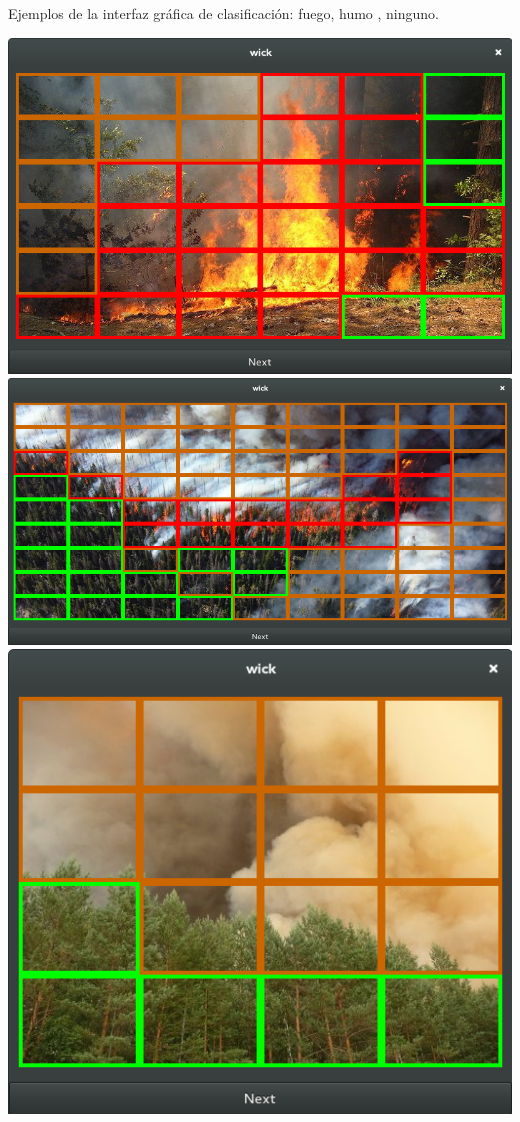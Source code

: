 \documentclass{article}
\begin{document}
Ejemplos de la interfaz gráfica de clasificación:  
{\color{red} fuego}, {\color{orange} humo} , {\color{green} ninguno}.
\begin{center}
    \includegraphics[width=\textwidth]{wick-class-01}
    \includegraphics[width=\textwidth]{wick-class-02}
    \includegraphics[width=\textwidth]{wick-class-03}

\end{center}
\end{document}

